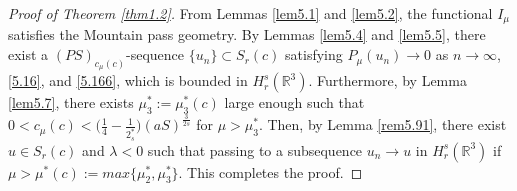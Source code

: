 \begin{proof}[Proof of Theorem \ref{thm1.2}]
From Lemmas \ref{lem5.1} and \ref{lem5.2}, the functional $I_\mu$ satisfies 
the Mountain pass geometry. By Lemmas \ref{lem5.4} and \ref{lem5.5}, there exist 
a $(PS)_{c_\mu(c)}$-sequence $\{u_n\}\subset S_{r}(c)$ satisfying  
$P_\mu(u_n)\to 0$ as $n\to \infty$, \eqref{5.16}, and \eqref{5.166}, 
which is bounded in $H^s_r(\mathbb{R}^3)$. 
Furthermore, by Lemma \ref{lem5.7}, there exists $\mu^*_3:=\mu^*_3(c)$ large enough 
such that $0<c_\mu(c)<\Big(\frac{1}{4}-\frac{1}{2^*_s}\Big)(aS)^{\frac{3}{2s}}$ 
for $\mu>\mu^*_3$. Then, by Lemma \ref{rem5.91}, there exist 
$u\in S_r(c)$ and $\lambda<0$ such that passing to a subsequence $u_n\to u$ in 
$H^s_r(\mathbb{R}^3)$ if   $\mu>\mu^*(c):=max\{\mu^*_2, \mu^*_3\}$. 
This completes the proof.
\end{proof}
